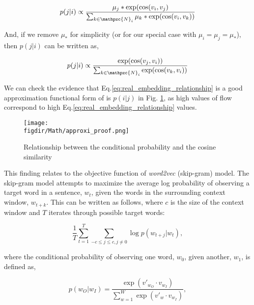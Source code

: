 \documentclass[12pt]{article} %
\def\figdir{../Figs}
\begin{document}
\begin{equation}
    p(j|i) \propto \frac{{\mu_j}* \exp(\cos(v_i,v_j)}{\sum_{k\in\mathpzc{N}_i} {\mu_k}* \exp(\cos(v_i,v_k))}
\end{equation}

And, if we remove ${\mu_*}$ for simplicity (or for our special case with $\mu_{i} = \mu_{j} = \mu_*$), then $p(j|i)$ can be written as,

\begin{equation}
    \label{eq:real_embedding_relationship}
    p(j|i) \propto \frac{\exp(\cos(v_j, v_i))}{\sum_{k\in\mathpzc{N}_i} \exp(\cos(v_k,v_i))}
\end{equation}

We can check the evidence that Eq.\ref{eq:real_embedding_relationship} is a good approximation functional form of is $p(i|j)$ in Fig. \ref{fig:real_embedding_relationship}, as high values of flow correspond to high Eq.\ref{eq:real_embedding_relationship} values.

%
%
\begin{figure}
    \centering
    \texttt{[image: \\figdir/Math/approxi\_proof.png]}
    \caption{Relationship between the conditional probability and the cosine similarity}
    \label{fig:real_embedding_relationship}
\end{figure}

This finding relates to the objective function of \textit{word2vec} (skip-gram) model. The skip-gram model attempts to maximize the average log probability of observing a target word in a sentence, $w_{t}$, given the words in the surrounding context window, $w_{t + k}$. This can be written as follows, where $c$ is the size of the context window and $T$ iterates through possible target words:

\begin{equation}
    \label{eq:skipgram_log_prob_condensed}
    \frac{1}{T}\sum_{t=1}^{T} \sum_{-c \le j \le c, j \neq 0} \log p(w_{t+j}|w_t),  
\end{equation}

where the conditional probability of observing one word, $w_{0}$, given another, $w_{1}$, is defined as,

\begin{equation}
    \label{eq:skipgram_conditional_expanded}
    p(w_O|w_I) = \frac{\exp(v'_{w_O} \cdot v_{w_I})}{\sum_{w=1}^{W} \exp(v'_w \cdot v_{w_I})}, 
\end{equation}
\end{document}
